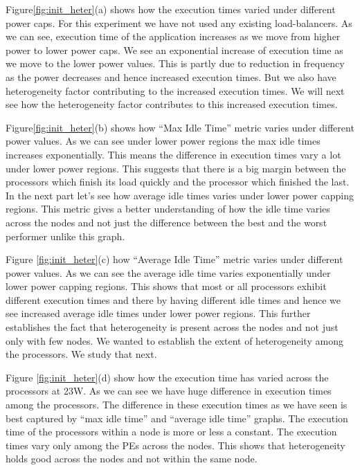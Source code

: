 Figure\ref{fig:init_heter}(a) shows how the execution times varied under different power
caps. For this experiment we have not used any existing load-balancers. As we
can see, execution time of the application increases as we move from higher
power to lower power caps. We see an exponential increase of execution time as
we move to the lower power values. This is partly due to reduction in frequency
as the power decreases and hence increased execution times. But we also have
heterogeneity factor contributing to the increased execution times. We will
next see how the heterogeneity factor contributes to this increased execution
times.

Figure\ref{fig:init_heter}(b) shows how “Max Idle Time” metric varies under
 different power values.  As we can see under lower power regions the max idle
 times increases exponentially. This means the difference in execution times
 vary a lot under lower power regions. This suggests that there is a big margin
 between the processors which finish its load quickly and the processor which
 finished the last. In the next part let’s see how average idle times varies
 under lower power capping regions. This metric gives a better understanding of
 how the idle time varies across the nodes and not just the difference between
 the best and the worst performer unlike this graph.


Figure \ref{fig:init_heter}(c) how “Average Idle Time” metric varies under
different power values. As we can see the average idle time varies exponentially
under lower power capping regions. This shows that most or all processors
exhibit different execution times and there by having different idle times and
hence we see increased average idle times under lower power regions. This
further establishes the fact that heterogeneity is present across the nodes and
not just only with few nodes. We wanted to establish the extent of
heterogeneity among the processors. We study that next.


Figure \ref{fig:init_heter}(d) show how the execution time has varied
across the processors at 23W. As we can see we have huge difference in
execution times among the processors. The difference in these execution times
as we have seen is best captured by “max idle time” and “average idle time”
graphs. The execution time of the processors within a node is more or less a
constant. The execution times vary only among the PEs across the nodes. This
shows that heterogeneity holds good across the nodes and not within the same
node.

